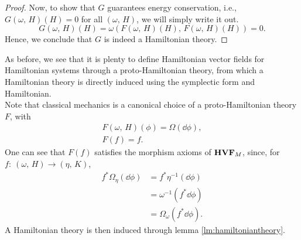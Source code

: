 \documentclass{article}
\newcommand{\category}[1]{{\normalfont\textbf{#1}}}
\begin{document}
\begin{multicols}{2}
\begin{proof}
		Now, to show that \(G\) guarantees energy conservation, i.e., \(G(\omega,\,H)(H)=0\) for all \((\omega,\,H)\), we will simply write it out.
		\begin{equation*}
			G(\omega,\,H)(H) = \omega(F(\omega,\, H)(H),\, F(\omega,\, H)(H)) = 0.
		\end{equation*}
		Hence, we conclude that \(G\) is indeed a Hamiltonian theory.
	\end{proof}
	As before, we see that it is plenty to define Hamiltonian vector fields for Hamiltonian systems through a proto-Hamiltonian theory, from which a Hamiltonian theory is directly induced using the symplectic form and Hamiltonian.\\
	Note that classical mechanics is a canonical choice of a proto-Hamiltonian theory \(F\), with
	\begin{align}
		F(\omega,\,H)(\phi) = \Omega(\dd{\phi}),\\
		F(f) = f.
	\end{align}
	One can see that \(F(f)\) satisfies the morphism axioms of \(\category{HVF}_M\), since, for \(f:\ (\omega,\,H)\to(\eta,\,K)\),
	\begin{align*}
		f^*\Omega_\eta(\dd{\phi}) &= f^*\eta^{-1}(\dd{\phi})\\
		&= \omega^{-1}(f^*\dd{\phi})\\
		&= \Omega_\omega(f^*\dd{\phi}).
	\end{align*}
	A Hamiltonian theory is then induced through lemma \ref{lm:hamiltoniantheory}.
\end{multicols}
\printbibliography
\end{document}
